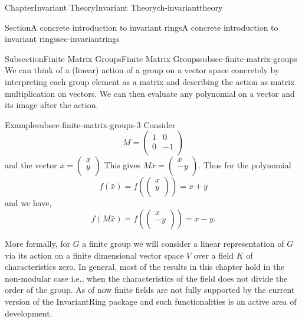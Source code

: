 \documentclass[oneside,10pt,]{book}
\newcommand{\amp}{&}
\begin{document}
\begin{chapterptx}{Chapter}{Invariant Theory}{}{Invariant Theory}{}{}{ch-invarianttheory}
\typeout{************************************************}
%
\begin{sectionptx}{Section}{A concrete introduction to invariant rings}{}{A concrete introduction to invariant rings}{}{}{sec-invariantrings}
%
%
\typeout{************************************************}
\typeout{************************************************}
%
\begin{subsectionptx}{Subsection}{Finite Matrix Groups}{}{Finite Matrix Groups}{}{}{subsec-finite-matrix-groups}
We can think of a (linear) action of a group on a vector space concretely by interpreting each group element as a matrix and describing the action as matrix multiplication on vectors. We can then evaluate any polynomial on a vector and its image after the action.%
\begin{example}{Example}{}{subsec-finite-matrix-groups-3}%
Consider%
\begin{equation*}
M =  \begin{pmatrix}
1 \amp 0 \\
0 \amp -1 \\
\end{pmatrix} 
\end{equation*}
and the vector \(\bar x = \begin{pmatrix} x\\ y\\ \end{pmatrix}\) This gives \(M \bar x = \begin{pmatrix}
x \\
-y  \\
\end{pmatrix}\). Thus for the polynomial%
\begin{equation*}
f(\bar x) = f(\begin{pmatrix}
x \\
y  \\
\end{pmatrix}) = x+y
\end{equation*}
and we have,%
\begin{equation*}
f(M\bar x) = f(\begin{pmatrix}
x \\
-y  \\
\end{pmatrix})= x-y\text{.}
\end{equation*}
%
\end{example}
More formally, for \(G \) a finite group we will consider a linear representation of \(G \) via its action on a finite dimensional vector space \(V \) over a field \(K \) of characteristics zero. In general, most of the results in this chapter hold in the non-modular case i.e., when the characteristics of the field does not divide the order of the group. As of now finite fields are not fully supported by the current version of the InvariantRing package and such functionalities is an active area of development.%

\end{subsectionptx}
\end{sectionptx}
\end{chapterptx}
\end{document}
